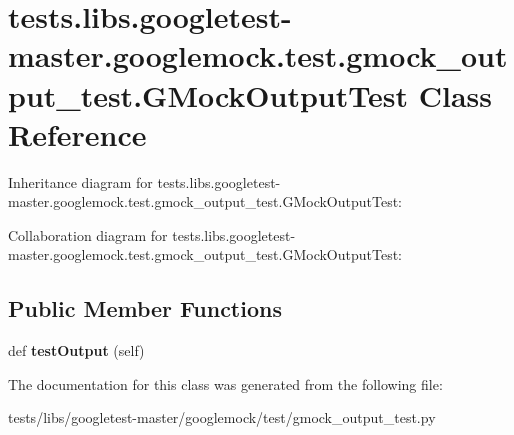 \hypertarget{classtests_1_1libs_1_1googletest-master_1_1googlemock_1_1test_1_1gmock__output__test_1_1GMockOutputTest}{}\section{tests.\+libs.\+googletest-\/master.googlemock.\+test.\+gmock\+\_\+output\+\_\+test.\+G\+Mock\+Output\+Test Class Reference}
\label{classtests_1_1libs_1_1googletest-master_1_1googlemock_1_1test_1_1gmock__output__test_1_1GMockOutputTest}


Inheritance diagram for tests.\+libs.\+googletest-\/master.googlemock.\+test.\+gmock\+\_\+output\+\_\+test.\+G\+Mock\+Output\+Test\+:


Collaboration diagram for tests.\+libs.\+googletest-\/master.googlemock.\+test.\+gmock\+\_\+output\+\_\+test.\+G\+Mock\+Output\+Test\+:
\subsection*{Public Member Functions}
\begin{DoxyCompactItemize}
\item 
\mbox{\label{classtests_1_1libs_1_1googletest-master_1_1googlemock_1_1test_1_1gmock__output__test_1_1GMockOutputTest_a32dd76453d227f1e35ed46c9577bdc2a}} 
def {\bfseries test\+Output} (self)
\end{DoxyCompactItemize}


The documentation for this class was generated from the following file\+:\begin{DoxyCompactItemize}
\item 
tests/libs/googletest-\/master/googlemock/test/gmock\+\_\+output\+\_\+test.\+py\end{DoxyCompactItemize}
